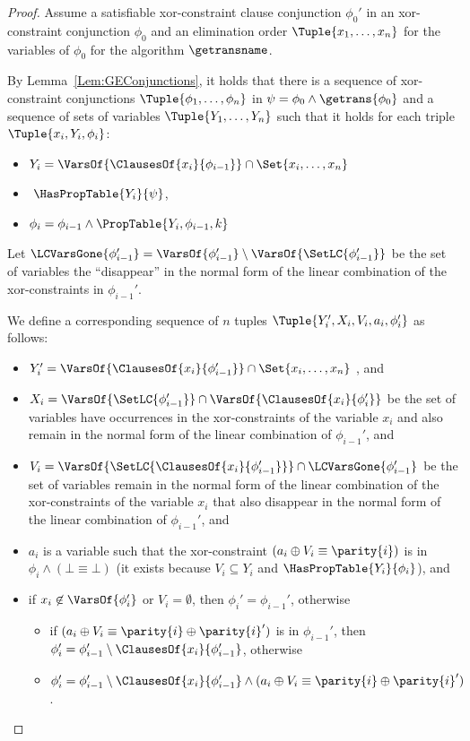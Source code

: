 \begin{proof}
Assume a satisfiable xor-constraint clause conjunction $ \phi_0' $ in an
xor-constraint conjunction $ \phi_0 $ and an elimination
order $ \Tuple{x_1, \dots, x_n}$ for the variables of $ \phi_0$
for the algorithm $ \getransname $.

By Lemma~\ref{Lem:GEConjunctions}, it holds that
there is a sequence of xor-constraint conjunctions $
\Tuple{\phi_1,\dots,\phi_n}$ in $ \psi = \phi_0 \wedge \getrans{\phi_0} $ and a sequence of sets of variables
$\Tuple{Y_1,\dots,Y_n}$ such that
it holds for each triple $ \Tuple{x_i,Y_i,\phi_i}$:
\begin{itemize}
\item $ Y_i = \VarsOf{\ClausesOf{x_i}{\phi_{i-1}}} \cap \Set{x_i,\dots,x_n} $
\item $ \HasPropTable{Y_i}{\psi}$,
\item $\phi_i = \phi_{i-1} \wedge \PropTable{Y_i,\phi_{i-1},k}$
\end{itemize}

Let $ \LCVarsGone{\phi_{i-1}'} = \VarsOf{\phi_{i-1}'} \setminus
\VarsOf{\SetLC{\phi_{i-1}'}}$ be the set of variables the ``disappear'' in the
normal form of the linear combination of the xor-constraints in $ \phi_{i-1}'$.

We define a corresponding sequence of $n$ tuples $\Tuple{Y_i', X_i, V_i, a_i,
    \phi_i'} $ as follows:
\begin{itemize}
\item $Y_i' = \VarsOf{\ClausesOf{x_i}{\phi_{i-1}'}} \cap \Set{x_i,\dots,x_n} $
, and
\item $X_i = \VarsOf{\SetLC{\phi_{i-1}'}} \cap \VarsOf{\ClausesOf{x_{i}}{\phi_i'}}$
be the set of variables have occurrences in the xor-constraints of the variable $x_i$
and also remain in the normal form of the linear combination of $ \phi_{i-1}'$, and
\item $V_i = \VarsOf{\SetLC{\ClausesOf{x_i}{ \phi_{i-1}'}}} \cap \LCVarsGone{\phi_{i-1}'} $
be the set of variables remain in the normal form of the linear combination of the xor-constraints of the variable $x_i$ that also disappear in the normal form of the linear combination of $ \phi_{i-1}'$, and
\item $a_i$ is a variable such that the xor-constraint $(a_i \oplus V_i \equiv \parity{i})$ is in $ \phi_i \wedge (\bot \equiv \bot) $ (it exists because $V_i \subseteq Y_i$ and $ \HasPropTable{Y_i}{\phi_i}$), and
\item if $ x_i \not \in \VarsOf{\phi_i'} $ or $ V_i = \emptyset $, then $ \phi_i' = \phi_{i-1}' $, otherwise
\begin{itemize}
\item if $ (a_i \oplus V_i \equiv \parity{i} \oplus \parity{i}') $ is in $ \phi_{i-1}'$,
    then $ \phi_i' = \phi_{i-1}' \setminus \ClausesOf{x_i}{\phi_{i-1}'}$, otherwise
\item 
$ \phi_i' = \phi_{i-1}' \setminus \ClausesOf{x_i}{\phi_{i-1}'} \wedge (a_i \oplus V_i \equiv \parity{i} \oplus \parity{i}')$.
\end{itemize}
\end{itemize}


\end{proof}
